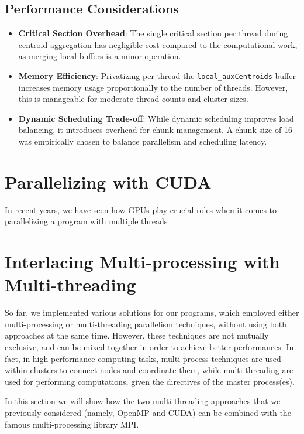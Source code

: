 \documentclass[11pt, journal]{IEEEtran}
\newcommand{\nwl}{

\vspace{11pt}

}
\begin{document}
\subsection{Performance Considerations}

\begin{itemize}
    \item \textbf{Critical Section Overhead}: The single critical section per thread during centroid aggregation has negligible cost compared to the computational work, as merging local buffers is a minor operation.
    \item \textbf{Memory Efficiency}: Privatizing per thread the \texttt{local\_auxCentroids} buffer increases memory usage proportionally to the number of threads. However, this is manageable for moderate thread counts and cluster sizes.
    \item \textbf{Dynamic Scheduling Trade-off}: While dynamic scheduling improves load balancing, it introduces overhead for chunk management. A chunk size of 16 was empirically chosen to balance parallelism and scheduling latency.
\end{itemize}

\section{Parallelizing with CUDA}

In recent years, we have seen how GPUs play crucial roles when it comes to parallelizing a program with multiple threads

\section{Interlacing Multi-processing with Multi-threading}

So far, we implemented various solutions for our programs, which employed either multi-processing or multi-threading parallelism techniques, without using both approaches at the same time. However, these techniques are not mutually exclusive, and can be mixed together in order to achieve better performances. In fact, in high performance computing tasks, multi-process techniques are used within clusters to connect nodes and coordinate them, while multi-threading are used for performing computations, given the directives of the master process(es).
\nwl
In this section we will show how the two multi-threading approaches that we previously considered (namely, OpenMP and CUDA) can be combined with the famous multi-processing library MPI.
\end{document}
